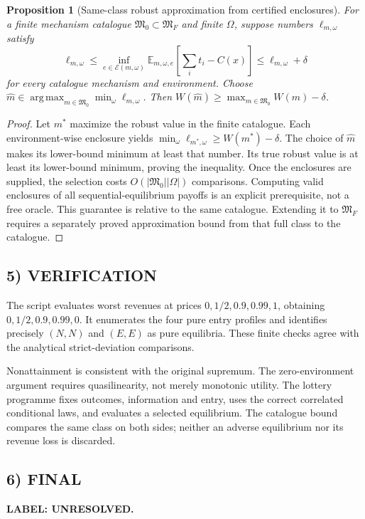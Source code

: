 \documentclass[11pt,a4paper]{article}
\newcommand{\E}{\mathbb E}
\DeclareMathOperator*{\argmax}{arg\,max}
\newtheorem{proposition}[theorem]{Proposition}
\theoremstyle{definition}
\newcommand{\unresolved}{\textbf{LABEL: UNRESOLVED.}}
\begin{document}
\begin{proposition}[Same-class robust approximation from certified enclosures]
For a finite mechanism catalogue $\mathfrak M_0\subset\mathfrak M_F$ and finite $\Omega$, suppose numbers $\ell_{m,\omega}$ satisfy
\[
 \ell_{m,\omega}\le
  \inf_{e\in\mathcal E(m,\omega)}\E_{m,\omega,e}\left[\sum_i t_i-C(x)\right]
  \le\ell_{m,\omega}+\delta
\]
for every catalogue mechanism and environment. Choose
$\widehat m\in\argmax_{m\in\mathfrak M_0}\min_\omega\ell_{m,\omega}$.
Then $W(\widehat m)\ge\max_{m\in\mathfrak M_0}W(m)-\delta$.
\end{proposition}
\begin{proof}
Let $m^*$ maximize the robust value in the finite catalogue. Each environment-wise enclosure yields
$\min_\omega\ell_{m^*,\omega}\ge W(m^*)-\delta$.
The choice of $\widehat m$ makes its lower-bound minimum at least that number. Its true robust value is at least its lower-bound minimum, proving the inequality. Once the enclosures are supplied, the selection costs $O(|\mathfrak M_0||\Omega|)$ comparisons. Computing valid enclosures of all sequential-equilibrium payoffs is an explicit prerequisite, not a free oracle. This guarantee is relative to the same catalogue. Extending it to $\mathfrak M_F$ requires a separately proved approximation bound from that full class to the catalogue.
\end{proof}

\subsection*{5) VERIFICATION}
The script evaluates worst revenues at prices $0,1/2,0.9,0.99,1$, obtaining $0,1/2,0.9,0.99,0$. It enumerates the four pure entry profiles and identifies precisely $(N,N)$ and $(E,E)$ as pure equilibria. These finite checks agree with the analytical strict-deviation comparisons.

Nonattainment is consistent with the original supremum. The zero-environment argument requires quasilinearity, not merely monotonic utility. The lottery programme fixes outcomes, information and entry, uses the correct correlated conditional laws, and evaluates a selected equilibrium. The catalogue bound compares the same class on both sides; neither an adverse equilibrium nor its revenue loss is discarded.

\subsection*{6) FINAL}
\unresolved
\end{document}

